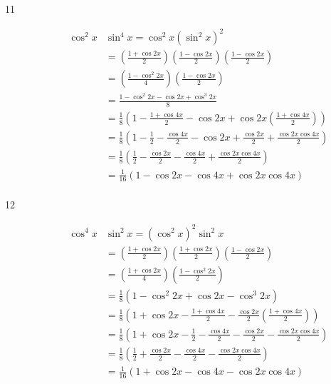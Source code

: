 \documentclass{exam}
\begin{document}
\begin{description}
      \item[11]
        \begin{align*}
          \cos^2 x & \sin^4 x = \cos^2 x \left( \sin^2 x \right)^2 \\
                   & = \left( \frac{1 + \cos 2x}{2} \right) \left( \frac{1 - \cos 2x}{2} \right) \left( \frac{1 - \cos 2x}{2} \right) \\
                   & = \left( \frac{1 - \cos^2 2x}{4} \right) \left( \frac{1 - \cos 2x}{2} \right) \\
                   & = \frac{1 - \cos^2 2x - \cos 2x + \cos^3 2x}{8} \\
                   & = \frac{1}{8} \left( 1 - \frac{1 + \cos 4x}{2} - \cos 2x + \cos 2x \left( \frac{1 + \cos 4x}{2} \right) \right) \\
                   & = \frac{1}{8} \left( 1 - \frac{1}{2} - \frac{\cos 4x}{2} - \cos 2x + \frac{\cos 2x}{2} + \frac{\cos 2x \cos 4x}{2} \right) \\
                   & = \frac{1}{8} \left( \frac{1}{2} - \frac{\cos 2x}{2} - \frac{\cos 4x}{2} + \frac{\cos 2x \cos 4x}{2} \right) \\
                   & = \boxed{ \frac{1}{16} ( 1 - \cos 2x - \cos 4x + \cos 2x \cos 4x ) } \\
        \end{align*}

      \item[12]
        \begin{align*}
          \cos^4 x & \sin^2 x = \left( \cos^2 x \right)^2 \sin^2 x \\
                   & = \left( \frac{1 + \cos 2x}{2} \right) \left( \frac{1 + \cos 2x}{2} \right) \left( \frac{1 - \cos 2x}{2} \right) \\
                   & = \left( \frac{1 + \cos 2x}{4} \right) \left( \frac{1 - \cos^2 2x}{2} \right) \\
                   & = \frac{1}{8} \left( 1 - \cos^2 2x + \cos 2x - \cos^3 2x \right) \\
                   & = \frac{1}{8} \left( 1 + \cos 2x - \frac{1 + \cos 4x}{2}  - \frac{\cos 2x}{2} \left( \frac{1 + \cos 4x}{2} \right) \right) \\
                   & = \frac{1}{8} \left( 1 + \cos 2x - \frac{1}{2}  - \frac{\cos 4x}{2} - \frac{\cos 2x}{2} - \frac{\cos 2x \cos 4x}{2} \right) \\
                   & = \frac{1}{8} \left( \frac{1}{2} + \frac{\cos 2x}{2} - \frac{\cos 4x}{2}  - \frac{\cos 2x \cos 4x}{2} \right) \\
                   & = \boxed{ \frac{1}{16} \left( 1 + \cos 2x - \cos 4x  - \cos 2x \cos 4x \right) } \\
        \end{align*}


\end{description}
\end{document}
